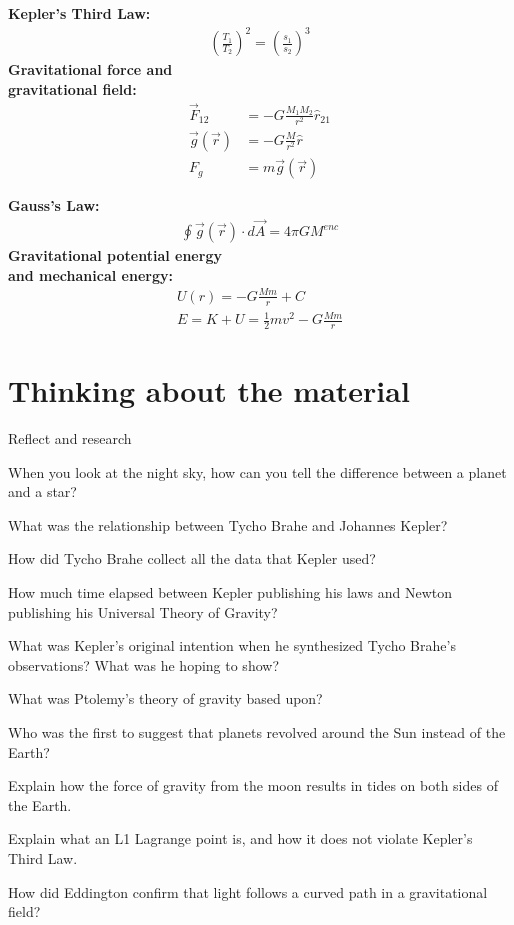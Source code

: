 \begin{importantEquations}
\medskip
\begin{multicols}{2}
\textbf{Kepler's Third Law:}
\begin{align*}
\left(\frac{T_1}{T_2}\right)^2=\left(\frac{s_1}{s_2}\right)^3
\end{align*}
\textbf{Gravitational force and\\ gravitational field:}
\begin{align*}
\vec F_{12}&=-G\frac{M_1M_2}{r^2}\hat r_{21}\\
\vec g(\vec r)&=-G\frac{M}{r^2}\hat r\\
F_g &= m \vec g(\vec r)
\end{align*}
\columnbreak

\textbf{Gauss's Law:}
\begin{align*}
\oint \vec g(\vec r) \cdot d\vec A = 4\pi G M^{enc}
\end{align*}
\textbf{Gravitational potential energy\\ and mechanical energy:}
\begin{align*}
U(r) = -G\frac{Mm}{r} + C\\
E = K + U = \frac{1}{2}mv^2 - G\frac{Mm}{r}
\end{align*}
\medskip
\end{multicols}
\end{importantEquations}


\newpage
\section{Thinking about the material}

\begin{chapteractivity}{Reflect and research}
{
\item When you look at the night sky, how can you tell the difference between a planet and a star?
\item What was the relationship between Tycho Brahe and Johannes Kepler?
\item How did Tycho Brahe collect all the data that Kepler used?
\item How much time elapsed between Kepler publishing his laws and Newton publishing his Universal Theory of Gravity?
\item What was Kepler's original intention when he synthesized Tycho Brahe's observations? What was he hoping to show?
\item What was Ptolemy's theory of gravity based upon?
\item Who was the first to suggest that planets revolved around the Sun instead of the Earth?
\item Explain how the force of gravity from the moon results in tides on both sides of the Earth.
\item Explain what an L1 Lagrange point is, and how it does not violate Kepler's Third Law.
\item How did Eddington confirm that light follows a curved path in a gravitational field?
}
\end{chapteractivity}

